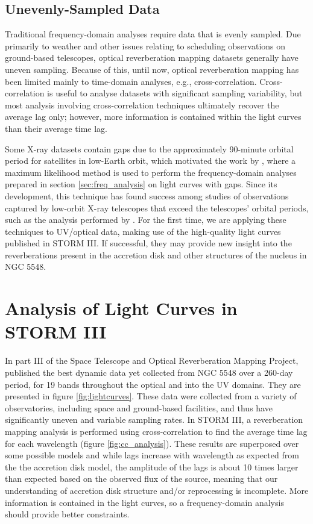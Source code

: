 \documentclass[11pt,letterpaper]{article}
\begin{document}
	\subsection{Unevenly-Sampled Data}
    \label{sec:uneven_data}

    Traditional frequency-domain analyses require data that is evenly sampled. Due primarily to weather and other issues relating to scheduling observations on ground-based telescopes, optical reverberation mapping datasets generally have uneven sampling. Because of this, until now, optical reverberation mapping has been limited mainly to time-domain analyses, e.g., cross-correlation. Cross-correlation is useful to analyse datasets with significant sampling variability, but most analysis involving cross-correlation techniques ultimately recover the average lag only; however, more information is contained within the light curves than their average time lag.

    Some X-ray datasets contain gaps due to the approximately 90-minute orbital period for satellites in low-Earth orbit, which motivated the work by \cite{2013ApJ...777...24Z}, where a maximum likelihood method is used to perform the frequency-domain analyses prepared in section \ref{sec:freq_analysis} on light curves with gaps. Since its development, this technique has found success among studies of observations captured by low-orbit X-ray telescopes that exceed the telescopes' orbital periods, such as the analysis performed by \cite{2016Natur.535..388K}. For the first time, we are applying these techniques to UV/optical data, making use of the high-quality light curves published in STORM III. If successful, they may provide new insight into the reverberations present in the accretion disk and other structures of the nucleus in NGC 5548.

\section{Analysis of Light Curves in STORM III}
\label{analysis}
In part III of the Space Telescope and Optical Reverberation Mapping Project, \cite{2016ApJ...821...56F} published the best dynamic data yet collected from NGC 5548 over a 260-day period, for 19 bands throughout the optical and into the UV domains. They are presented in figure \ref{fig:lightcurves}. These data were collected from a variety of observatories, including space and ground-based facilities, and thus have significantly uneven and variable sampling rates. In STORM III, a reverberation mapping analysis is performed using cross-correlation to find the average time lag for each wavelength (figure \ref{fig:cc_analysis}). These results are superposed over some possible models and while lags increase with wavelength as expected from the the accretion disk model, the amplitude of the lags is about 10 times larger than expected based on the observed flux of the source, meaning that our understanding of accretion disk structure and/or reprocessing is incomplete. More information is contained in the light curves, so a frequency-domain analysis should provide better constraints.
\end{document}
